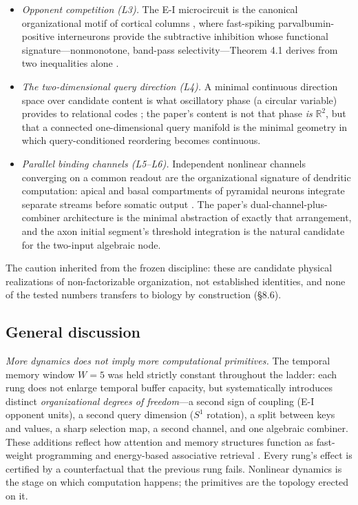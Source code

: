 \begin{itemize}[leftmargin=*,noitemsep,topsep=1pt]
\item \emph{Opponent competition (L3).} The E-I microcircuit is the
canonical organizational motif of cortical columns
\citep{mountcastle1997}, where fast-spiking parvalbumin-positive
interneurons provide the subtractive inhibition whose functional
signature---nonmonotone, band-pass selectivity---Theorem 4.1 derives from
two inequalities alone \citep{amari1977}.
\item \emph{The two-dimensional query direction (L4).} A minimal
continuous direction space over candidate content is what oscillatory
phase (a circular variable) provides to relational codes
\citep{singer1999}; the paper's content is not that phase \emph{is}
$\mathbb{R}^2$, but that a connected one-dimensional query manifold is the
minimal geometry in which query-conditioned reordering becomes continuous.
\item \emph{Parallel binding channels (L5--L6).} Independent nonlinear
channels converging on a common readout are the organizational signature
of dendritic computation: apical and basal compartments of pyramidal
neurons integrate separate streams before somatic output
\citep{london2005,poirazi2003}. The paper's dual-channel-plus-combiner
architecture is the minimal abstraction of exactly that arrangement, and
the axon initial segment's threshold integration is the natural candidate
for the two-input algebraic node.
\end{itemize}

The caution inherited from the frozen discipline: these are candidate
physical realizations of non-factorizable organization, not established
identities, and none of the tested numbers transfers to biology by
construction (§8.6).

\subsection{General discussion}
\label{sec:discussion}

\emph{More dynamics does not imply more computational primitives.} The
temporal memory window $W=5$ was held strictly constant throughout the ladder:
each rung does not enlarge temporal buffer capacity, but systematically introduces
distinct \emph{organizational degrees of freedom}---a second sign of coupling
(E-I opponent units), a second query dimension ($S^1$ rotation), a split between
keys and values, a sharp selection map, a second channel, and one algebraic
combiner. These additions reflect how attention and memory structures function
as fast-weight programming and energy-based associative retrieval
\citep{schlag2021,ramsauer2020}. Every rung's effect is certified by a
counterfactual that the previous rung fails. Nonlinear dynamics is
the stage on which computation happens; the primitives are the topology
erected on it.

